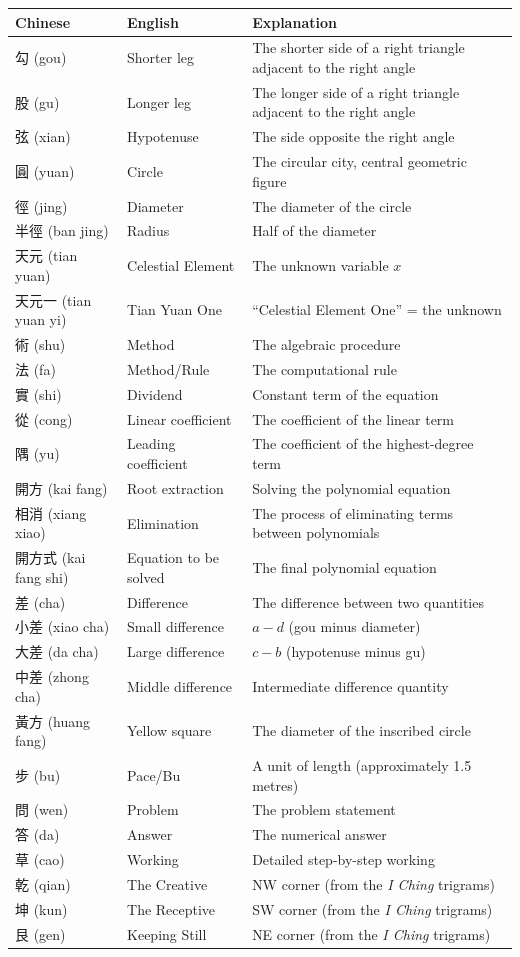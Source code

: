 \documentclass[11pt,a4paper]{book}
\begin{document}
\begin{longtable}{l|l|p{6cm}}
\toprule
\textbf{Chinese} & \textbf{English} & \textbf{Explanation} \\
\midrule
\endhead
勾 (gou) & Shorter leg & The shorter side of a right triangle adjacent to the right angle \\
股 (gu) & Longer leg & The longer side of a right triangle adjacent to the right angle \\
弦 (xian) & Hypotenuse & The side opposite the right angle \\
圓 (yuan) & Circle & The circular city, central geometric figure \\
徑 (jing) & Diameter & The diameter of the circle \\
半徑 (ban jing) & Radius & Half of the diameter \\
天元 (tian yuan) & Celestial Element & The unknown variable $x$ \\
天元一 (tian yuan yi) & Tian Yuan One & ``Celestial Element One'' = the unknown \\
術 (shu) & Method & The algebraic procedure \\
法 (fa) & Method/Rule & The computational rule \\
實 (shi) & Dividend & Constant term of the equation \\
從 (cong) & Linear coefficient & The coefficient of the linear term \\
隅 (yu) & Leading coefficient & The coefficient of the highest-degree term \\
開方 (kai fang) & Root extraction & Solving the polynomial equation \\
相消 (xiang xiao) & Elimination & The process of eliminating terms between polynomials \\
開方式 (kai fang shi) & Equation to be solved & The final polynomial equation \\
差 (cha) & Difference & The difference between two quantities \\
小差 (xiao cha) & Small difference & $a - d$ (gou minus diameter) \\
大差 (da cha) & Large difference & $c - b$ (hypotenuse minus gu) \\
中差 (zhong cha) & Middle difference & Intermediate difference quantity \\
黃方 (huang fang) & Yellow square & The diameter of the inscribed circle \\
步 (bu) & Pace/Bu & A unit of length (approximately 1.5 metres) \\
問 (wen) & Problem & The problem statement \\
答 (da) & Answer & The numerical answer \\
草 (cao) & Working & Detailed step-by-step working \\
乾 (qian) & The Creative & NW corner (from the \textit{I Ching} trigrams) \\
坤 (kun) & The Receptive & SW corner (from the \textit{I Ching} trigrams) \\
艮 (gen) & Keeping Still & NE corner (from the \textit{I Ching} trigrams) \\
\bottomrule
\end{longtable}
\end{document}
